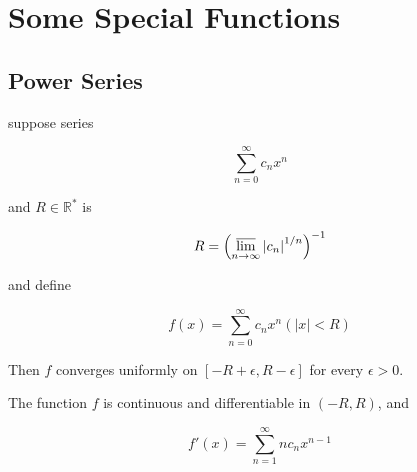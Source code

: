 \section{Some Special Functions}

\subsection{Power Series}

\begin{thm}
suppose series  

\[
    \sum_{n=0}^\infty c_nx^n
\]

and $R \in \mathbb{R}^*$ is

\[
    R = \left(\varlimsup_{n \to \infty} \left| c_n \right|^{1/n} \right)^{-1}
\]

and define

\[
    f(x) = \sum_{n=0}^{\infty} c_n x^n \left( |x| < R\right)
\]

Then $f$ converges uniformly on $[-R + \epsilon, R -\epsilon]$ for every $\epsilon >0$.

The function $f$ is continuous and differentiable in $(-R,R)$, and 

\[
    f'(x) = \sum_{n=1}^{\infty}nc_nx^{n-1}
\]
\end{thm}

